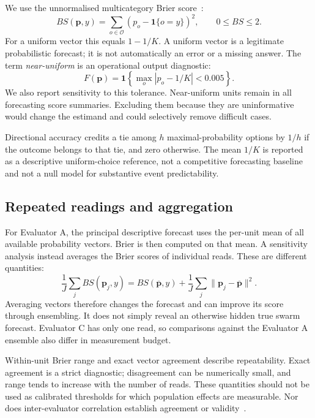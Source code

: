 \documentclass[10pt,conference]{IEEEtran}
\begin{document}
We use the unnormalised multicategory Brier score~\cite{brier1950,gneiting2007}:
\begin{equation}
 BS(\mathbf p,y)=\sum_{o\in\mathcal O}
       (p_o-\mathbf 1\{o=y\})^2,\qquad 0\leq BS\leq 2.
\end{equation}
For a uniform vector this equals $1-1/K$. A uniform vector is a legitimate
probabilistic forecast; it is not automatically an error or a missing answer.
The term \emph{near-uniform} is an operational output diagnostic:
\begin{equation}
 F(\mathbf p)=\mathbf 1\left\{\max_o |p_o-1/K|<0.005\right\}.
\end{equation}
We also report sensitivity to this tolerance. Near-uniform units remain in all
forecasting score summaries. Excluding them because they are uninformative
would change the estimand and could selectively remove difficult cases.

Directional accuracy credits a tie among $h$ maximal-probability options by
$1/h$ if the outcome belongs to that tie, and zero otherwise. The mean
$1/K$ is reported as a descriptive uniform-choice reference, not a competitive
forecasting baseline and not a null model for substantive event predictability.

\subsection{Repeated readings and aggregation}
For Evaluator A, the principal descriptive forecast uses the per-unit mean
of all available probability vectors. Brier is then computed on that mean.
A sensitivity analysis instead averages the Brier scores of individual reads.
These are different quantities:
\begin{equation}
 \frac{1}{J}\sum_j BS(\mathbf p_j,y)
 =BS(\overline{\mathbf p},y)
 +\frac{1}{J}\sum_j\|\mathbf p_j-\overline{\mathbf p}\|^2.
\end{equation}
Averaging vectors therefore changes the forecast and can improve its score
through ensembling. It does not simply reveal an otherwise hidden true
swarm forecast. Evaluator C has only one read, so comparisons against the
Evaluator A ensemble also differ in measurement budget.

Within-unit Brier range and exact vector agreement describe repeatability.
Exact agreement is a strict diagnostic; disagreement can be numerically small,
and range tends to increase with the number of reads. These quantities should
not be used as calibrated thresholds for which population effects are measurable.
Nor does inter-evaluator correlation establish agreement or
validity~\cite{bland1986agreement}.
\end{document}
